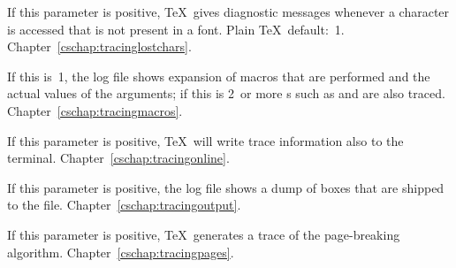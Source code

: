 \begin{glossinventory}
\item [\cs{tracinglostchars}]
      If this parameter is positive, \TeX\ gives      
      diagnostic messages whenever a character is accessed that      
      is not present in a font. Plain \TeX\ default:~1.
Chapter~\ref{cschap:tracinglostchars}.

\item [\cs{tracingmacros}]
      If this is~1, the log file shows expansion of macros 
      that are performed and the actual values of the arguments; 
      if this is 2~or more
      s such as 
       and  are also traced.
Chapter~\ref{cschap:tracingmacros}.

\item [\cs{tracingonline}]
      If this parameter is positive, \TeX\ will write trace      
      information also to the terminal.
Chapter~\ref{cschap:tracingonline}.

\item [\cs{tracingoutput}]
      If this parameter is positive, the log file shows a dump of boxes 
      that are shipped to the  file.
Chapter~\ref{cschap:tracingoutput}.

\item [\cs{tracingpages}]
      If this parameter is positive, \TeX\ generates      
      a trace of the page-breaking algorithm.
Chapter~\ref{cschap:tracingpages}.


\end{glossinventory}
